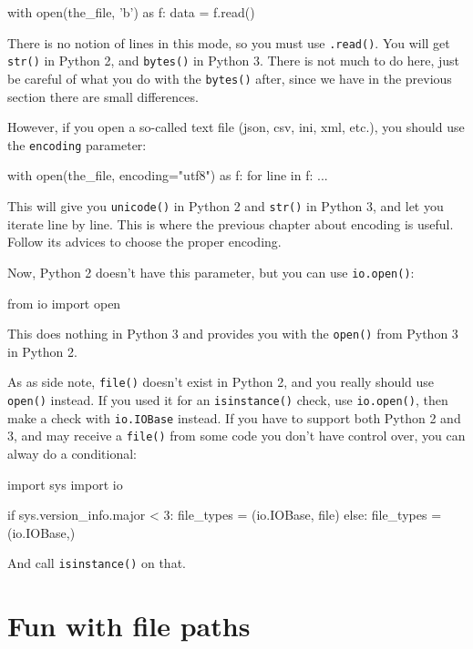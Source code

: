 \begin{py2and3}
with open(the_file, 'b') as f:
    data = f.read()
\end{py2and3}

There is no notion of lines in this mode, so you must use \lstinline{.read()}. You will get \lstinline{str()} in Python 2, and \lstinline{bytes()} in Python 3. There is not much to do here, just be careful of what you do with the \lstinline{bytes()} after, since we have in the previous section there are small differences.

However, if you open a so-called text file (json, csv, ini, xml, etc.), you should use the \lstinline{encoding} parameter:

\begin{py3}
with open(the_file, encoding="utf8") as f:
    for line in f:
        ...
\end{py3}

This will give you \lstinline{unicode()} in Python 2 and \lstinline{str()} in Python 3, and let you iterate line by line. This is where the previous chapter about encoding is useful. Follow its advices to choose the proper encoding.

Now, Python 2 doesn't have this parameter, but you can use \lstinline{io.open()}:

\begin{py2and3}
from io import open
\end{py2and3}

This does nothing in Python 3 and provides you with the \lstinline{open()} from Python 3 in Python 2.

As as side note, \lstinline{file()} doesn't exist in Python 2, and you really should use \lstinline{open()} instead. If you used it for an \lstinline{isinstance()} check, use \lstinline{io.open()}, then make a check with \lstinline{io.IOBase} instead. If you have to support both Python 2 and 3, and may receive a \lstinline{file()} from some code you don't have control over, you can alway do a conditional:

\begin{py2and3}
import sys
import io

if sys.version_info.major < 3:
    file_types = (io.IOBase, file)
else:
    file_types = (io.IOBase,)
\end{py2and3}

And call \lstinline{isinstance()} on that.

\section{Fun with file paths}

